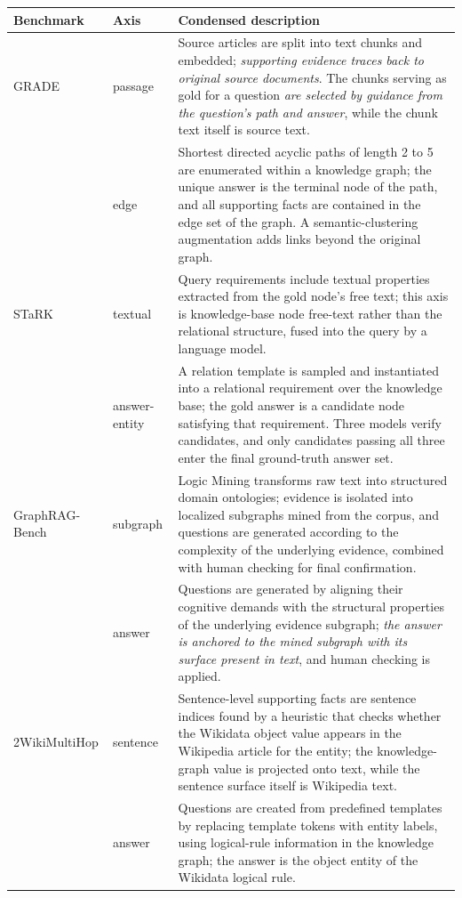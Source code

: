 \documentclass[11pt]{article}
\begin{document}
\begin{table}[tp]\centering\footnotesize
\setlength{\tabcolsep}{3pt}\emergencystretch=2pt
\begin{tabular}{@{}p{}p{}p{}@{}}
\toprule
\raggedright Benchmark & Axis & Condensed description\tabularnewline
\midrule
\raggedright GRADE & passage & Source articles are split into text chunks and embedded; \emph{supporting evidence traces back to original source documents}. The chunks serving as gold for a question \emph{are selected by guidance from the question's path and answer}, while the chunk text itself is source text.\tabularnewline
 & edge & Shortest directed acyclic paths of length 2 to 5 are enumerated within a knowledge graph; the unique answer is the terminal node of the path, and all supporting facts are contained in the edge set of the graph. A semantic-clustering augmentation adds links beyond the original graph.\tabularnewline
\addlinespace[1.5pt]
\raggedright STaRK & textual & Query requirements include textual properties extracted from the gold node's free text; this axis is knowledge-base node free-text rather than the relational structure, fused into the query by a language model.\tabularnewline
 & answer-entity & A relation template is sampled and instantiated into a relational requirement over the knowledge base; the gold answer is a candidate node satisfying that requirement. Three models verify candidates, and only candidates passing all three enter the final ground-truth answer set.\tabularnewline
\addlinespace[1.5pt]
\raggedright GraphRAG-Bench & subgraph & Logic Mining transforms raw text into structured domain ontologies; evidence is isolated into localized subgraphs mined from the corpus, and questions are generated according to the complexity of the underlying evidence, combined with human checking for final confirmation.\tabularnewline
 & answer & Questions are generated by aligning their cognitive demands with the structural properties of the underlying evidence subgraph; \emph{the answer is anchored to the mined subgraph with its surface present in text}, and human checking is applied.\tabularnewline
\addlinespace[1.5pt]
\raggedright 2WikiMultiHop & sentence & Sentence-level supporting facts are sentence indices found by a heuristic that checks whether the Wikidata object value appears in the Wikipedia article for the entity; the knowledge-graph value is projected onto text, while the sentence surface itself is Wikipedia text.\tabularnewline
 & answer & Questions are created from predefined templates by replacing template tokens with entity labels, using logical-rule information in the knowledge graph; the answer is the object entity of the Wikidata logical rule.\tabularnewline

\end{tabular}
\end{table}
\end{document}
